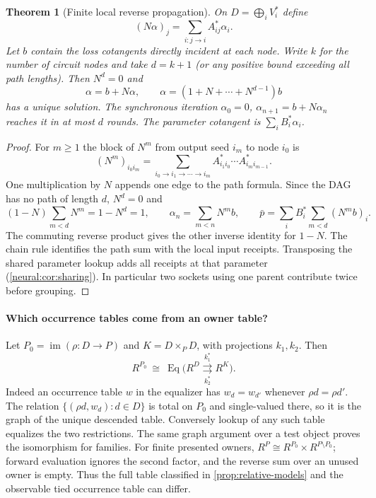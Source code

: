 \documentclass[11pt,a4paper]{article}
\newtheorem{theorem}{Theorem}[section]
\theoremstyle{definition}
\theoremstyle{remark}\newaliascnt{remark}{theorem}
\numberwithin{equation}{section}
\begin{document}
\begin{theorem}[Finite local reverse propagation]\label{neural:thm:nilpotent}
On $D=\bigoplus_iV_i^*$ define
\[
 (N\alpha)_j=\sum_{i:j\to i}A_{ij}^*\alpha_i.
\]
Let $b$ contain the loss cotangents directly incident at each node. Write $k$ for the number of circuit nodes and take $d=k+1$ (or any positive bound exceeding all path lengths). Then $N^d=0$ and
\[
 \alpha=b+N\alpha,\qquad
 \alpha=(1+N+\cdots+N^{d-1})b
\]
has a unique solution. The synchronous iteration $\alpha_0=0$, $\alpha_{n+1}=b+N\alpha_n$ reaches it in at most $d$ rounds. The parameter cotangent is $\sum_i B_i^*\alpha_i$.
\end{theorem}
\begin{proof}
For \(m\ge1\) the block of \(N^m\) from output seed \(i_m\) to node \(i_0\) is
\[
 (N^m)_{i_0i_m}
    =\sum_{i_0\to i_1\to\cdots\to i_m}
             A_{i_1 i_0}^*\cdots A_{i_m i_{m-1}}^* .
\]
One multiplication by \(N\) appends one edge to the path formula. Since the DAG has no path of length \(d\), \(N^d=0\) and
\[
 (1-N)\sum_{m<d}N^m=1-N^d=1,\qquad
 \alpha_n=\sum_{m<n}N^m b,\qquad
 \bar p=\sum_iB_i^*\sum_{m<d}(N^m b)_i .
\]
The commuting reverse product gives the other inverse identity for \(1-N\). The chain rule identifies the path sum with the local input receipts. Transposing the shared parameter lookup adds all receipts at that parameter (\cref{neural:cor:sharing}). In particular two sockets using one parent contribute twice before grouping.
\end{proof}
\paragraph{Which occurrence tables come from an owner table?}
Let \(P_0=\operatorname{im}(\rho:D\to P)\) and \(K=D\times_P D\), with projections \(k_1,k_2\). Then
\[
 R^{P_0}\ \cong\ \operatorname{Eq}\bigl(R^D
             \overset{k_1^*}{\underset{k_2^*}{\rightrightarrows}} R^K\bigr).
\]
Indeed an occurrence table \(w\) in the equalizer has \(w_d=w_{d'}\) whenever \(\rho d=\rho d'\). The relation \(\{(\rho d,w_d):d\in D\}\) is total on \(P_0\) and single-valued there, so it is the graph of the unique descended table. Conversely lookup of any such table equalizes the two restrictions. The same graph argument over a test object proves the isomorphism for families. For finite presented owners, \(R^P\cong R^{P_0}\times R^{P\setminus P_0}\); forward evaluation ignores the second factor, and the reverse sum over an unused owner is empty. Thus the full table classified in \cref{prop:relative-models} and the observable tied occurrence table can differ.
\end{document}

